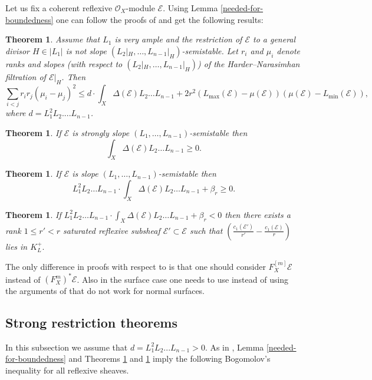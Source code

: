 \documentclass[12pt]{article}
\theoremstyle{plain}
\newtheorem{Theorem}[Thm]{\sc Theorem}
\theoremstyle{definition}
\theoremstyle{remark}
\newcommand{\cE}{{\mathcal E}}
\newcommand{\cO}{{\mathcal O}}
\begin{document}
Let us fix a coherent reflexive $\cO_X$-module $\cE$.
Using Lemma \ref{needed-for-boundedness} one can follow the proofs of \cite[Theorems 3.1, 3.2, 3.3 and 3.4]{La1}
and get the following results:

\begin{Theorem}\label{restriction}
Assume that $L_1$ is very ample and
the restriction of $\cE$ to a general divisor $H\in |L_1|$ is not slope
$(L_2|_H,\dots , L_{n-1}|_H)$-semistable. 
Let $r _i$ and $\mu_i$ denote  ranks and  slopes (with respect to $(L_2|_H,\dots , L_{n-1}|_H)$)
 of the Harder--Narasimhan filtration  of $\cE|_H$. Then
$$\sum _{i<j} r_{i} r_{j}(\mu _{i} -\mu _{j})^2\le
d \cdot \int_X\Delta (\cE)L_2\dots L_{n-1}+2r^2(L_{\max}(\cE) -\mu (\cE)) (\mu (\cE) -L_{\min} (\cE)),
$$ 
where $d=L_1^2L_2....L_{n-1}$.
\end{Theorem}

\begin{Theorem}\label{Bog1}
If $\cE$ is strongly slope
$(L_1,\dots, L_{n-1})$-semistable  then 
$$ \int_X \Delta (\cE)L_2\dots L_{n-1}\ge 0.$$ 
\end{Theorem}


\begin{Theorem}\label{Bog2}
If $\cE$ is  slope $(L_1,\dots, L_{n-1})$-semistable then 
$$L_1^2L_2\dots L_{n-1}\cdot
\int_X \Delta (\cE)L_2\dots L_{n-1}+ \beta _r\ge 0.
$$
\end{Theorem}


\begin{Theorem}
If
$L_1^2L_2\dots L_{n-1}\cdot\int_X  \Delta (\cE) L_2\dots L_{n-1}+  \beta _r<0$ 
then there exists a rank $1\le r'<r$ saturated reflexive subsheaf $\cE '\subset \cE$ such that
$\left( \frac{c_1(\cE')}{r'}- \frac{c_1(\cE)}{r}\right)$ lies in $ K^+_L.$ 
\end{Theorem}


The only difference in proofs with respect to \cite{La1} is that one should consider $F_X^{[m]}\cE$ instead of $(F_X^m)^*\cE$. Also in the surface case one needs to  use \cite[Corollary 6.6]{La-Chern} instead of using the arguments of \cite{La1} that do not work for normal surfaces. 


\medskip


\subsection{Strong restriction theorems}

In this subsection  we assume that  $d=L_1^2L_2...L_{n-1}>0$. As in \cite[Theorem 5.1]{La1}, Lemma \ref{needed-for-boundedness}  and Theorems \ref{Bog1} and \ref{Bog2} imply the following
Bogomolov's inequality for all reflexive sheaves. 
\end{document}
